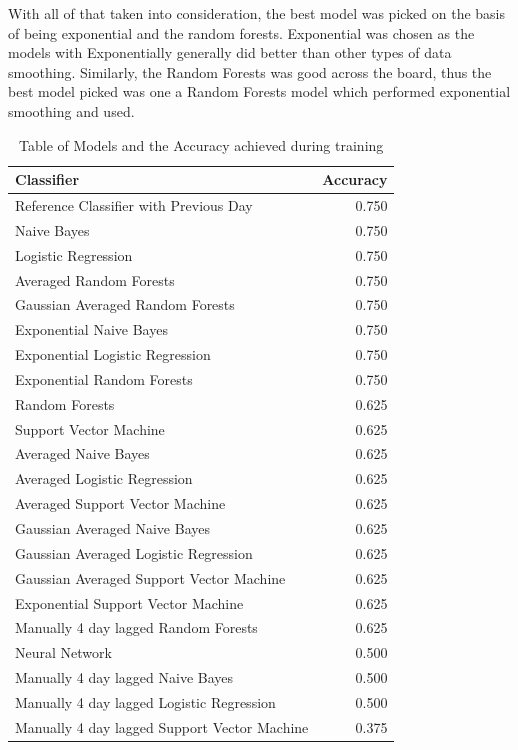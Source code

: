 With all of that taken into consideration, the best model was picked on the basis of being exponential and the random forests. Exponential was chosen as the models with Exponentially generally did better than other types of data smoothing. Similarly, the Random Forests was good across the board, thus the best model picked was one a Random Forests model which performed exponential smoothing and used.
\begin{table}[H]
	\centering 
\begin{tabular}{lr}

	Classifier &  Accuracy \\
	\hline
	Reference Classifier with Previous Day & 0.750\\
	\hline
                                  Naive Bayes &     0.750 \\
Logistic Regression &     0.750 \\
Averaged Random Forests &     0.750 \\
Gaussian Averaged Random Forests &     0.750 \\
Exponential Naive Bayes &     0.750 \\
Exponential Logistic Regression &     0.750 \\
Exponential Random Forests &     0.750 \\
Random Forests &     0.625 \\
Support Vector Machine &     0.625 \\
Averaged Naive Bayes &     0.625 \\
Averaged Logistic Regression &     0.625 \\
Averaged Support Vector Machine &     0.625 \\
Gaussian Averaged Naive Bayes &     0.625 \\
Gaussian Averaged Logistic Regression &     0.625 \\
Gaussian Averaged Support Vector Machine &     0.625 \\
Exponential Support Vector Machine &     0.625 \\
Manually 4 day lagged Random Forests &     0.625 \\
Neural Network & 0.500 \\
Manually 4 day lagged Naive Bayes &     0.500 \\
Manually 4 day lagged Logistic Regression &     0.500 \\
Manually 4 day lagged Support Vector Machine &     0.375 \\
	

\end{tabular}

	\caption{Table of Models and the Accuracy achieved during training}
		\label{table:modaccuracy}
\end{table}
